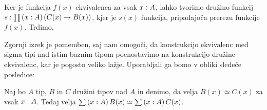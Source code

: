\begin{dokaz}
  Ker je funkcija \(f(x)\) ekvivalenca za vsak \(x : A\),
  lahko tvorimo družino funkcij
  \(s : \prod \left( x : A \right) \left(C(x) \to B(x)\right)\), kjer je \(s(x)\)
  funkcija, pripadajoča prerezu funkcije \(f(x)\).
  Trdimo,
\end{dokaz}

Zgornji izrek je pomemben, saj nam omogoči, da konstrukcijo ekvivalenc med sigma tipi
nad istim baznim tipom poenostavimo na konstrukcijo družine ekvivalenc, kar je pogosto
veliko lažje. Uporabljali ga bomo v obliki sledeče posledice:

\begin{posledica}
  \label{equiv-tot}
  Naj bo \(A\) tip, \(B\) in \(C\) družini tipov nad \(A\) in denimo, da velja
  \(B(x) \simeq C(x)\) za vsak \(x : A\).
  Tedaj velja \(\sum \left( x : A \right) B(x) \simeq \sum \left( x : A \right) C(x)\).
\end{posledica}


